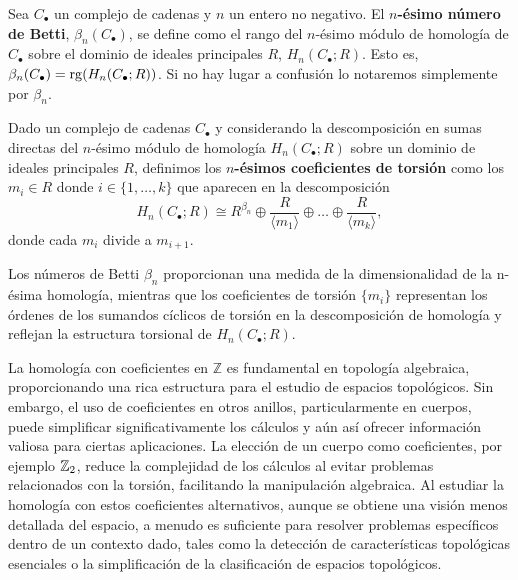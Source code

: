 \begin{definicion}
	Sea \(C_{\bullet}\) un complejo de cadenas y \(n\) un entero no negativo. El
	\textbf{\(n\)-ésimo número de Betti}, \(\beta_{n}(C_{\bullet})\), se define como el
	rango del \(n\)-ésimo módulo de homología de \(C_{\bullet}\) sobre el dominio de ideales
	principales \(R\), \(H_{n}(C_{\bullet};R)\). Esto es,
	\(\beta_{n}(C_{\bullet}) = \operatorname{rg}(H_{n}(C_{\bullet};R))\). Si no hay lugar a confusión
	lo notaremos simplemente por \(\beta_{n}\).
\end{definicion}

\begin{definicion}
	Dado un complejo de cadenas \(C_{\bullet}\) y considerando la descomposición en sumas
	directas del \(n\)-ésimo módulo de homología \(H_{n}(C_{\bullet};R)\) sobre un dominio
	de ideales principales \(R\), definimos los \textbf{\(n\)-ésimos coeficientes de
		torsión} como los \(m_{i} \in R\) donde \(i \in \{1, \ldots, k\}\) que aparecen en
	la descomposición
	\[
	H_{n}(C_{\bullet};R) \cong R^{\beta_n}\oplus \frac{R}{\langle m_{1} \rangle}\oplus
	\ldots \oplus \frac{R}{\langle m_{k} \rangle},
	\]
	donde cada \(m_{i}\) divide a \(m_{i+1}\).
\end{definicion}

Los números de Betti \(\beta_{n}\) proporcionan una medida de la dimensionalidad
de la n-ésima homología, mientras que los coeficientes de torsión \(\{m_{i}\}\) representan
los órdenes de los sumandos cíclicos de torsión en la descomposición de homología
y reflejan la estructura torsional de \(H_{n}(C_{\bullet};R)\).

La homología con coeficientes en \(\mathbb{Z}\) es fundamental en topología algebraica, proporcionando una rica estructura para el estudio de espacios topológicos. Sin embargo, el uso de coeficientes en otros anillos, particularmente en cuerpos, puede simplificar significativamente los cálculos y aún así ofrecer información valiosa para ciertas aplicaciones. La elección de un cuerpo como coeficientes, por ejemplo \(\mathbb{Z}_2\), reduce la complejidad de los cálculos al evitar problemas relacionados con la torsión, facilitando la manipulación algebraica. Al estudiar la homología con estos coeficientes alternativos, aunque se obtiene una visión menos detallada del espacio, a menudo es suficiente para resolver problemas específicos dentro de un contexto dado, tales como la detección de características topológicas esenciales o la simplificación de la clasificación de espacios topológicos.

\endinput
